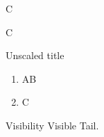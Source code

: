 \documentclass{beamer}
\begin{document}
\begin{frame}[plain,t]
\begin{pgfpicture}
\end{pgfpicture}\quad C
\end{frame}
\begin{frame}[plain,t]
\begin{pgfpicture}
\end{pgfpicture}\quad C
\end{frame}
\begin{frame}[shrink=20]{Unscaled title}
\begin{enumerate}
\item AB
\item C
\end{enumerate}
\end{frame}
\begin{frame}[shrink=20]{Visibility}
Visible  Tail.
\end{frame}
\end{document}
